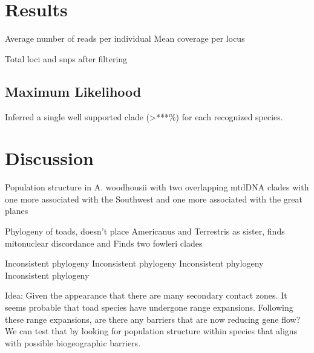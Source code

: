 \section{Results}
Average number of reads per individual
Mean coverage per locus

Total loci and snps after filtering

\subsection{Maximum Likelihood}
Inferred a single well supported clade (>***\%) for each recognized species. 




\section{Discussion}


Population structure in A. woodhousii with two overlapping mtdDNA clades 
with one more associated with the Southwest and one more associated with the 
great planes \parencite{masta2003}

Phylogeny of toads, doesn't place Americanus and Terrestris as sister, finds
mitonuclear discordance and Finds two fowleri clades \parencite{fontenot2011}

Inconsistent phylogeny \parencite{masta2002}
Inconsistent phylogeny \parencite{pramuk2007}
Inconsistent phylogeny \parencite{graybeal1997}
Inconsistent phylogeny \parencite{pyron2011}

Idea:
Given the appearance that there are many secondary contact zones. It seems 
probable that toad species have undergone range expansions. Following these
range expansions, are there any barriers that are now reducing gene flow?
We can test that by looking for population structure within species that 
aligns with possible biogeographic barriers.